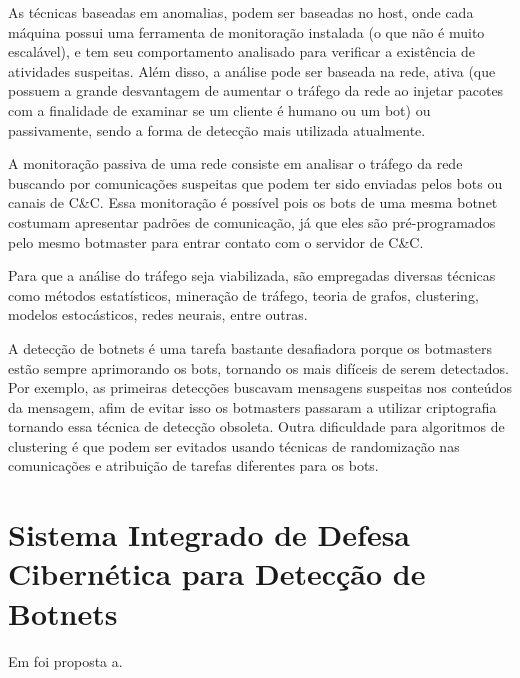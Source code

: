 As técnicas baseadas em anomalias, podem ser baseadas no host, onde cada máquina possui uma ferramenta de monitoração instalada (o que não é muito escalável), e tem seu comportamento analisado para verificar a existência de atividades suspeitas. Além disso, a análise pode ser baseada na rede, ativa (que possuem a grande desvantagem de aumentar o tráfego da rede ao injetar pacotes com a finalidade de examinar se um cliente é humano ou um bot) ou passivamente, sendo a forma de detecção mais utilizada atualmente.

A monitoração passiva de uma rede consiste em analisar o tráfego da rede buscando por comunicações suspeitas que podem ter sido enviadas pelos bots ou canais de C\&C. Essa monitoração é possível pois os bots de uma mesma botnet costumam apresentar padrões de comunicação, já que eles são pré-programados pelo mesmo botmaster para entrar contato com o servidor de C\&C.

Para que a análise do tráfego seja viabilizada, são empregadas diversas técnicas como métodos estatísticos, mineração de tráfego, teoria de grafos, clustering, modelos estocásticos, redes neurais, entre outras.

A detecção de botnets é uma tarefa bastante desafiadora porque os botmasters estão sempre aprimorando os bots, tornando os mais difíceis de serem detectados. Por exemplo, as primeiras detecções buscavam mensagens suspeitas nos conteúdos da mensagem, afim de evitar isso os botmasters passaram a utilizar criptografia tornando essa técnica de detecção obsoleta. Outra dificuldade para algoritmos de clustering é que podem ser evitados usando técnicas de randomização nas comunicações e atribuição de tarefas diferentes para os bots.

\section{Sistema Integrado de Defesa Cibernética para Detecção de Botnets}
Em \cite{silva2012arquitetura} foi proposta a.
